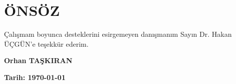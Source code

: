 \section*{ÖNSÖZ}
\vspace{.5cm}
Çalışmam boyunca desteklerini esirgemeyen danışmanım Sayın Dr. Hakan ÜÇGÜN'e teşekkür ederim.

\vspace{2cm}
\begin{flushright}
\begin{minipage}{5cm}
\begin{center}
\textbf{Orhan TAŞKIRAN}

\textbf{Tarih: {\today}}\hfill
\end{center}
\end{minipage}
\end{flushright}
